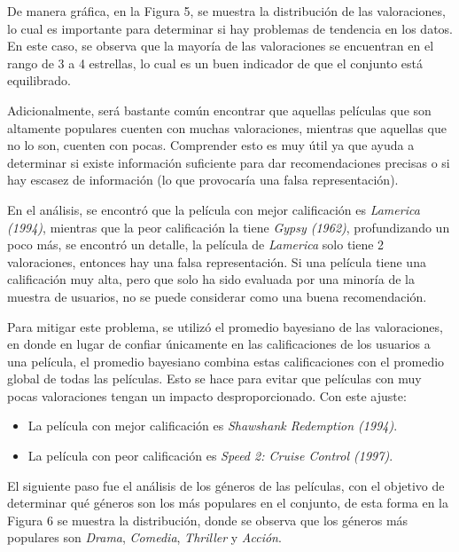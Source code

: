 \documentclass[letterpaper,10pt,final,hyphenatedtitles]{papertexKS}
\begin{document}
\begin{news}{2}
	De manera gráfica, en la Figura 5, se muestra la distribución de las valoraciones, lo cual es importante para determinar si hay problemas de tendencia en los datos. En este caso, se observa que la mayoría de las valoraciones se encuentran en el rango de 3 a 4 estrellas, lo cual es un buen indicador de que el conjunto está equilibrado.

	\begin{center}
	\end{center}

	Adicionalmente, será bastante común encontrar que aquellas películas que son altamente populares cuenten con muchas valoraciones, mientras que aquellas que no lo son, cuenten con pocas. Comprender esto es muy útil ya que ayuda a determinar si existe información suficiente para dar recomendaciones precisas o si hay escasez de información (lo que provocaría una falsa representación).

	En el análisis, se encontró que la película con mejor calificación es \textit{Lamerica (1994)}, mientras que la peor calificación la tiene \textit{Gypsy (1962)}, profundizando un poco más, se encontró un detalle, la película de \textit{Lamerica} solo tiene 2 valoraciones, entonces hay una falsa representación. Si una película tiene una calificación muy alta, pero que solo ha sido evaluada por una minoría de la muestra de usuarios, no se puede considerar como una buena recomendación.

	Para mitigar este problema, se utilizó el promedio bayesiano de las valoraciones, en donde en lugar de confiar únicamente en las calificaciones de los usuarios a una película, el promedio bayesiano combina estas calificaciones con el promedio global de todas las películas. Esto se hace para evitar que películas con muy pocas valoraciones tengan un impacto desproporcionado. Con este ajuste:

	\begin{itemize}
		\item La película con mejor calificación es \textit{Shawshank Redemption (1994)}.
		\item La película con peor calificación es \textit{Speed 2: Cruise Control (1997)}.
	\end{itemize}

	El siguiente paso fue el análisis de los géneros de las películas, con el objetivo de determinar qué géneros son los más populares en el conjunto, de esta forma en la Figura 6 se muestra la distribución, donde se observa que los géneros más populares son \textit{Drama}, \textit{Comedia}, \textit{Thriller} y \textit{Acción}.


\end{news}
\end{document}
